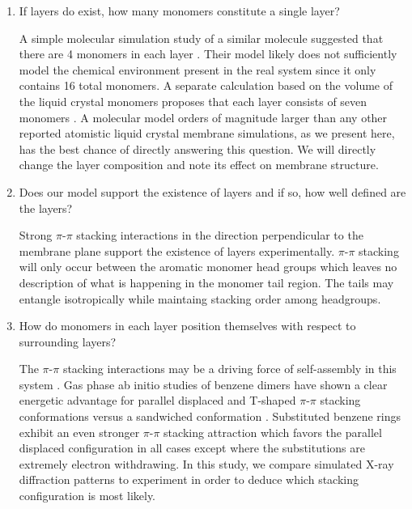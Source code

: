 \documentclass{article}
\begin{document}
  \begin{enumerate}

  \item If layers do exist, how many monomers constitute a single layer? \label{point:monomernum}
  
  A simple molecular simulation study of a similar molecule suggested that
  there are 4 monomers in each layer \cite{zhu_methacrylated_2006}. Their 
  model likely does not sufficiently model the chemical environment present
  in the real system since it only contains 16 total monomers.
  A separate calculation based on the volume of the liquid crystal monomers
  proposes that each layer consists of seven monomers
  \cite{resel_structural_2000}.  A molecular model orders of magnitude larger
  than any other reported atomistic liquid crystal membrane simulations, as we
  present here, has the best chance of directly answering this question.  We will
  directly change the layer composition and note its effect on membrane
  structure.

 \item Does our model support the existence of layers and if so, how well
 defined are the layers? \label{point:layers} 

  Strong $\pi$-$\pi$ stacking interactions in the direction perpendicular to
  the membrane plane support the existence of layers experimentally.  $\pi$-$\pi$
  stacking will only occur between the aromatic monomer head groups which leaves
  no description of what is happening in the monomer tail region.  The tails may
  entangle isotropically while maintaing stacking order among headgroups. 

  \item How do monomers in each layer position themselves with respect to
  surrounding layers? \label{point:orientation}

  The $\pi$-$\pi$ stacking interactions may be a driving force of self-assembly
  in this system \cite{gazit_possible_2002}. Gas phase ab initio studies of
  benzene dimers have shown a clear energetic advantage for parallel displaced
  and T-shaped $\pi$-$\pi$ stacking conformations versus a sandwiched
  conformation \cite{sinnokrot_estimates_2002}. Substituted benzene rings
  exhibit an even stronger $\pi$-$\pi$ stacking attraction which favors the
  parallel displaced configuration in all cases except where the substitutions
  are extremely electron withdrawing.
  \cite{waller_hybrid_2006,ringer_effect_2006} In this study, we compare
  simulated X-ray diffraction patterns to experiment in order to deduce which
  stacking configuration is most likely. 


\end{enumerate}
\end{document}

